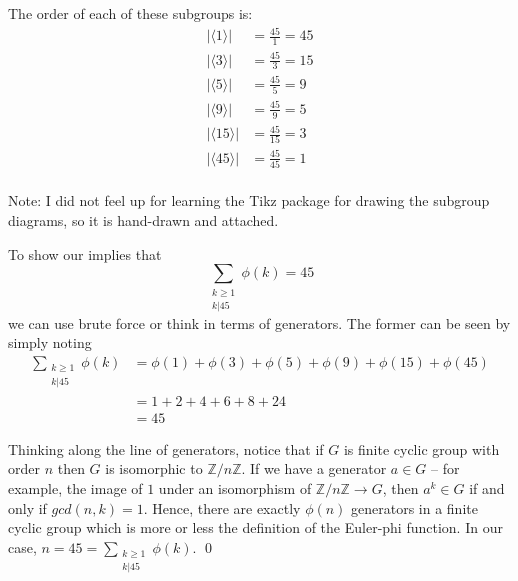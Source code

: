 \documentclass{article}
\begin{document}
The order of each of these subgroups is:
\begin{align*}
	\lvert \langle 1 \rangle \vert &= \frac{45}{1} = 45 \\
	\lvert \langle 3 \rangle \vert &= \frac{45}{3} = 15 \\
	\lvert \langle 5 \rangle \vert &= \frac{45}{5} = 9 \\
	\lvert \langle 9 \rangle \vert &= \frac{45}{9} = 5 \\
	\lvert \langle 15 \rangle \vert &= \frac{45}{15} = 3 \\
	\lvert \langle 45 \rangle \vert &= \frac{45}{45} = 1 \\
\end{align*}

Note: I did not feel up for learning the Tikz package for drawing the subgroup diagrams, so it is hand-drawn and attached.

To show our implies that 
$$\sum\limits_{\substack{k \geq 1 \\ k \rvert 45}} \phi(k) = 45$$
we can use brute force or think in terms of generators. The former can be seen by simply noting
\begin{align*}
	\sum\limits_{\substack{k \geq 1 \\ k \rvert 45}} \phi(k) &= \phi(1) + \phi(3) + \phi(5) + \phi(9) + \phi(15) + \phi(45) \\
	&= 1 + 2 + 4 + 6 + 8 + 24 \\
	&= 45
\end{align*}

Thinking along the line of generators, notice that if $G$ is finite cyclic group with order $n$ then 
$G$ is isomorphic to $\mathbb{Z}/n\mathbb{Z}$. If we have a generator $a \in G$ -- for example, the image of $1$ under an isomorphism of $\mathbb{Z}/n\mathbb{Z} \to G$, then $a^{k} \in G$ if and only if $gcd(n, k) = 1.$ Hence, there are exactly $\phi(n)$ generators in a finite cyclic group which is more or less the definition of the Euler-phi function. In our case, $n = 45 =  \sum\limits_{\substack{k \geq 1 \\ k \rvert 45}} \phi(k).$ \qed
\end{document}
